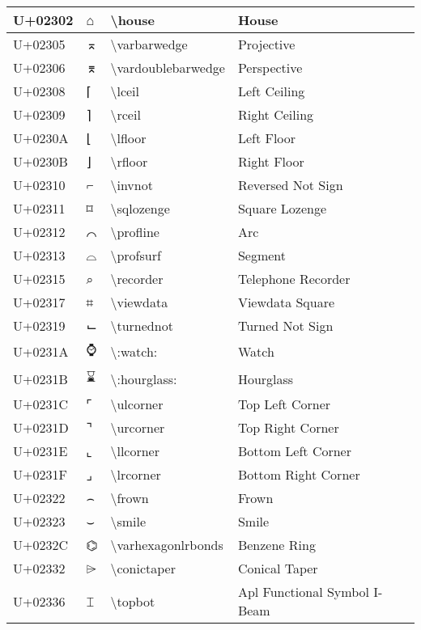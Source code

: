 \begin{table}[h]
\begin{tabulary}{\linewidth}{|L|L|L|L|}
\hline
U+02302 & ⌂ & {\textbackslash}house & House \\
\hline
U+02305 & ⌅ & {\textbackslash}varbarwedge & Projective \\
\hline
U+02306 & ⌆ & {\textbackslash}vardoublebarwedge & Perspective \\
\hline
U+02308 & ⌈ & {\textbackslash}lceil & Left Ceiling \\
\hline
U+02309 & ⌉ & {\textbackslash}rceil & Right Ceiling \\
\hline
U+0230A & ⌊ & {\textbackslash}lfloor & Left Floor \\
\hline
U+0230B & ⌋ & {\textbackslash}rfloor & Right Floor \\
\hline
U+02310 & ⌐ & {\textbackslash}invnot & Reversed Not Sign \\
\hline
U+02311 & ⌑ & {\textbackslash}sqlozenge & Square Lozenge \\
\hline
U+02312 & ⌒ & {\textbackslash}profline & Arc \\
\hline
U+02313 & ⌓ & {\textbackslash}profsurf & Segment \\
\hline
U+02315 & ⌕ & {\textbackslash}recorder & Telephone Recorder \\
\hline
U+02317 & ⌗ & {\textbackslash}viewdata & Viewdata Square \\
\hline
U+02319 & ⌙ & {\textbackslash}turnednot & Turned Not Sign \\
\hline
U+0231A & ⌚ & {\textbackslash}:watch: & Watch \\
\hline
U+0231B & ⌛ & {\textbackslash}:hourglass: & Hourglass \\
\hline
U+0231C & ⌜ & {\textbackslash}ulcorner & Top Left Corner \\
\hline
U+0231D & ⌝ & {\textbackslash}urcorner & Top Right Corner \\
\hline
U+0231E & ⌞ & {\textbackslash}llcorner & Bottom Left Corner \\
\hline
U+0231F & ⌟ & {\textbackslash}lrcorner & Bottom Right Corner \\
\hline
U+02322 & ⌢ & {\textbackslash}frown & Frown \\
\hline
U+02323 & ⌣ & {\textbackslash}smile & Smile \\
\hline
U+0232C & ⌬ & {\textbackslash}varhexagonlrbonds & Benzene Ring \\
\hline
U+02332 & ⌲ & {\textbackslash}conictaper & Conical Taper \\
\hline
U+02336 & ⌶ & {\textbackslash}topbot & Apl Functional Symbol I-Beam \\

\end{tabulary}
\end{table}
